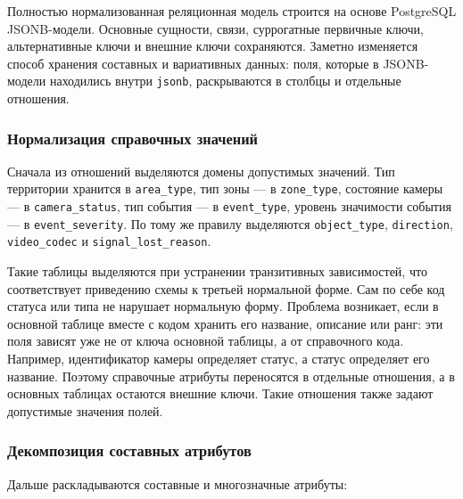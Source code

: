 Полностью нормализованная реляционная модель строится на основе
PostgreSQL JSONB-модели. Основные сущности, связи, суррогатные первичные
ключи, альтернативные ключи и внешние ключи сохраняются. Заметно изменяется
способ хранения составных и вариативных данных:
поля, которые в JSONB-модели находились внутри \texttt{jsonb}, раскрываются
в столбцы и отдельные отношения.

\subsubsection{Нормализация справочных значений}

Сначала из отношений выделяются домены допустимых
значений. Тип территории хранится в \texttt{area\_type}, тип зоны --- в
\texttt{zone\_type}, состояние камеры --- в \texttt{camera\_status}, тип
события --- в \texttt{event\_type}, уровень значимости события --- в
\texttt{event\_severity}. По тому же правилу выделяются
\texttt{object\_type}, \texttt{direction}, \texttt{video\_codec} и
\texttt{signal\_lost\_reason}.

Такие таблицы выделяются при устранении транзитивных зависимостей, что
соответствует приведению схемы к третьей нормальной форме. Сам по себе код
статуса или типа не нарушает нормальную форму. Проблема возникает, если в
основной таблице вместе с кодом хранить его название, описание или ранг: эти
поля зависят уже не от ключа основной таблицы, а от справочного кода.
Например, идентификатор камеры определяет статус, а статус определяет его
название. Поэтому справочные атрибуты переносятся в отдельные отношения, а в
основных таблицах остаются внешние ключи. Такие отношения также задают
допустимые значения полей.

\subsubsection{Декомпозиция составных атрибутов}

Дальше раскладываются составные и многозначные атрибуты:

